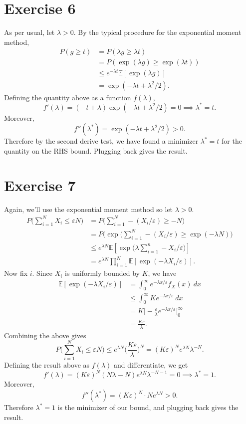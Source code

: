 \section*{Exercise 6}
As per usual, let $\lambda > 0$. By the typical procedure for the exponential moment method, 
\begin{align*}
	P(g \geq t) 
	&= P(\lambda g \geq \lambda t) \\
	&= P(\exp{(\lambda g)} \geq \exp{(\lambda t)}) \\
	&\leq e^{-\lambda t} \mathbb{E}[\exp{(\lambda g)}] \\
	&= \exp{(-\lambda t + \lambda^2 / 2)}.
\end{align*}
Defining the quantity above as a function $f(\lambda)$, 
\[ f'(\lambda) = (-t + \lambda)\exp{(-\lambda t + \lambda^2 / 2)} = 0 \implies \lambda^* = t. \]
Moreover, 
\[ f''(\lambda^*) = \exp{(-\lambda t + \lambda^2 / 2)} > 0. \]
Therefore by the second derive test, we have found a minimizer $\lambda^* = t$ for the quantity on the 
RHS bound. Plugging back gives the result.


\newpage
\section*{Exercise 7}
Again, we'll use the exponential moment method so let $\lambda > 0$. 
\begin{align*}
	P \biggl( \sum_{i = 1}^{N} X_i \leq \varepsilon N \biggr) 
	&= P \biggl( \sum_{i = 1}^{N} -(X_i / \varepsilon) \geq -N \biggr) \\
	&= P \biggl( \exp{\biggl( \sum_{i = 1}^{N} -(X_i / \varepsilon)} \geq 
	\exp{(- \lambda N)} \biggr) \\
	&\leq e^{\lambda N} \mathbb{E}[\exp{\biggl( \lambda \sum_{i = 1}^{n} -X_i / \varepsilon \biggr)}] \\
	&= e^{\lambda N} \prod_{i = 1}^{N} \mathbb{E}[\exp{(-\lambda X_i / \varepsilon)}].
\end{align*}
Now fix $i$. Since $X_i$ is uniformly bounded by $K$, we have 
\begin{align*}
	\mathbb{E}[\exp{(-\lambda X_i / \varepsilon)}] 
	&= \int_{0}^{\infty} e^{-\lambda x / \varepsilon} f_X(x) \ dx \\
	&\leq \int_{0}^{\infty} Ke^{-\lambda x / \varepsilon} \ dx \\
	&= K \biggl[ -\frac{\varepsilon}{\lambda} e^{-\lambda x / \varepsilon} \biggr]_0^\infty \\
	&= \frac{K \varepsilon}{\lambda}.
\end{align*}
Combining the above gives 
\[ P \biggl( \sum_{i = 1}^{N} X_i  \leq \varepsilon N \biggr) \leq e^{\lambda N} 
\biggl( \frac{K \varepsilon}{\lambda} \biggr)^N = (K \varepsilon)^N e^{\lambda N} \lambda^{-N}. \]
Defining the result above as $f(\lambda)$ and differentiate, we get 
\[ f'(\lambda) = (K \varepsilon)^N (N \lambda - N) e^{\lambda N} \lambda^{-N - 1} = 0 
\implies \lambda^* = 1. \]
Moreover, 
\[ f''(\lambda^*) = (K \varepsilon)^N \cdot Ne^{\lambda N} > 0. \]
Therefore $\lambda^* = 1$ is the minimizer of our bound, and plugging back gives the result.


